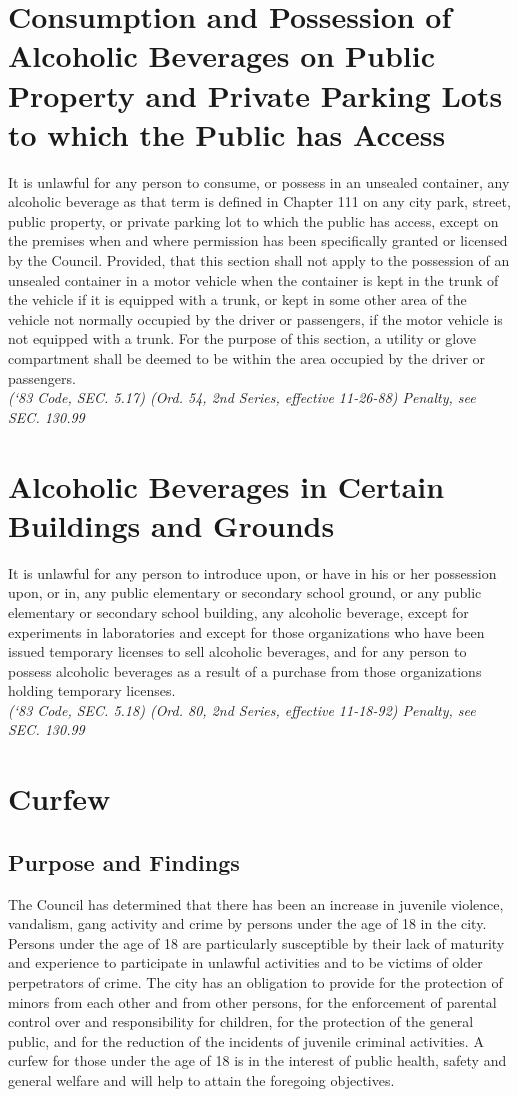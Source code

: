 \section{Consumption and Possession of Alcoholic Beverages on Public Property and Private Parking Lots to which the Public has Access}
It is unlawful for any person to consume, or possess in an unsealed container, any alcoholic beverage as that term is defined in Chapter 111 on any city park, street, public property, or private parking lot to which the public has access, except on the premises when and where permission has been specifically granted or licensed by the Council.  Provided, that this section shall not apply to the possession of an unsealed container in a motor vehicle when the container is kept in the trunk of the vehicle if it is equipped with a trunk, or kept in some other area of the vehicle not normally occupied by the driver or passengers, if the motor vehicle is not equipped with a trunk.  For the purpose of this section, a utility or glove compartment shall be deemed to be within the area occupied by the driver or passengers.\\
\emph{(‘83 Code, SEC. 5.17)  (Ord. 54, 2nd Series, effective 11-26-88)  Penalty, see SEC. 130.99}
\section{Alcoholic Beverages in Certain Buildings and Grounds}
It is unlawful for any person to introduce upon, or have in his or her possession upon, or in, any public elementary or secondary school ground, or any public elementary or secondary school building, any alcoholic beverage, except for experiments in laboratories and except for those organizations who have been issued temporary licenses to sell alcoholic beverages, and for any person to possess alcoholic beverages as a result of a purchase from those organizations holding temporary licenses.\\
\emph{(‘83 Code, SEC. 5.18)  (Ord. 80, 2nd Series, effective 11-18-92)  Penalty, see SEC. 130.99}
\section{Curfew}
\subsection{Purpose and Findings}
The Council has determined that there has been an increase in juvenile violence, vandalism, gang activity and crime by persons under the age of 18 in the city.  Persons under the age of 18 are particularly susceptible by their lack of maturity and experience to participate in unlawful activities and to be victims of older perpetrators of crime.  The city has an obligation to provide for the protection of minors from each other and from other persons, for the enforcement of parental control over and responsibility for children, for the protection of the general public, and for the reduction of the incidents of juvenile criminal activities.  A curfew for those under the age of 18 is in the interest of public health, safety and general welfare and will help to attain the foregoing objectives.
